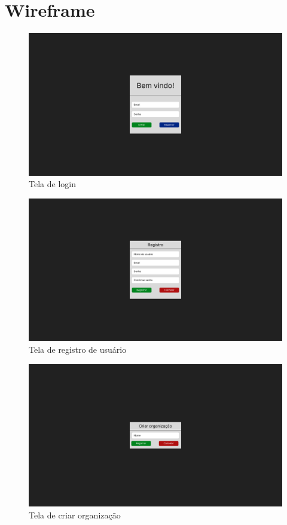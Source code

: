 \chapter{Wireframe}

\begin{figure}[h]
    \centering
    \includegraphics[width=1\textwidth]{../figures/login.png}
    \caption{Tela de login}
    \label{fig:login}
\end{figure}

\begin{figure}[h]
    \centering
    \includegraphics[width=1\textwidth]{../figures/registrar.png}
    \caption{Tela de registro de usuário}
    \label{fig:registrar}
\end{figure}

\begin{figure}[h]
    \centering
    \includegraphics[width=1\textwidth]{../figures/criar-organizacao.png}
    \caption{Tela de criar organização}
    \label{fig:criar-organizacao}
\end{figure}

